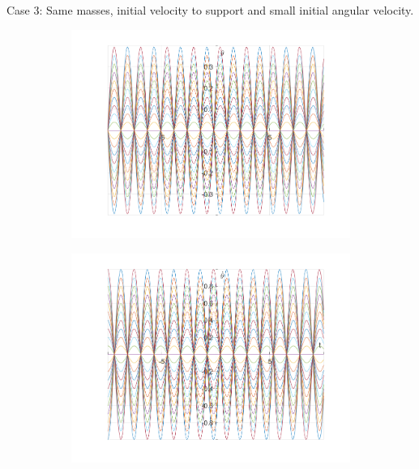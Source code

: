 \documentclass{article}
\begin{document}
	
	Case 3:
	Same masses, initial velocity to support and small initial angular velocity.
	\graphicspath{{./SmallOscillations/S3} }
	\begin{figure}[h!]
		\centering
		\begin{subfigure}[b]{0.48\linewidth}
			\includegraphics[width=\linewidth]{./SmallOscillations/S3/F1.png}
		\end{subfigure}
		\begin{subfigure}[b]{0.48\linewidth}
			\includegraphics[width=\linewidth]{./SmallOscillations/S3/F2.png}
		\end{subfigure}
	\end{figure}
\end{document}
